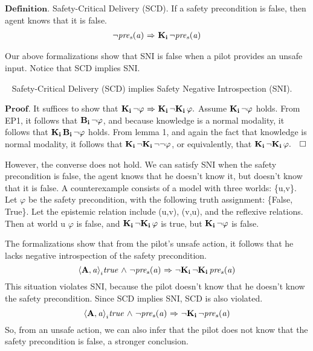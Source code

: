\noindent$\mathbf{Definition.}$ Safety-Critical Delivery (SCD). If a safety precondition is false, then agent knows that it is false. 
\begin{eqnarray*}
		{\neg} \mathit{pre_s}(\mathit{a}) {\ \Rightarrow \ } \mathbf{K}_{\mathbf{i}}\,{\neg} \mathit{pre_s}(\mathit{a})
\end{eqnarray*}


Our above formalizations show that SNI is false when a pilot provides an unsafe input. 
Notice that SCD implies SNI.
\begin{lemma}~\label{udsni}
	Safety-Critical Delivery (SCD) implies Safety Negative Introspection (SNI).
\end{lemma}	
$\mathbf{Proof}$. It suffices to show that $\mathbf{K}_{\mathbf{i}}\,{\neg}\varphi {\ \Rightarrow \ } \mathbf{K}_{\mathbf{i}}\,{\neg}\mathbf{K}_{\mathbf{i}}\, \varphi.$
Assume $\mathbf{K}_{\mathbf{i}}\,{\neg}\varphi$ holds. From EP1, it follows that $\mathbf{B}_{\mathbf{i}}\,{\neg}\varphi$, and because knowledge is a normal modality, it follows that $\mathbf{K}_{\mathbf{i}}\,\mathbf{B}_{\mathbf{i}}\,{\neg}\varphi$ holds. From lemma 1, and again the fact that knowledge is normal modality, it follows that $\mathbf{K}_{\mathbf{i}}\,{\neg}\mathbf{K}_{\mathbf{i}}\,{\neg}{\neg}\varphi$, or equivalently, that $\mathbf{K}_{\mathbf{i}}\,{\neg}\mathbf{K}_{\mathbf{i}}\,\varphi.\quad\Box$

However, the converse does not hold. We can satisfy SNI when the safety precondition is false, the agent knows that he doesn't know it, but doesn't know that it is false. A counterexample consists of a model with three worlds: \{u,v\}. Let $\varphi$ be the safety precondition, with the following truth assignment: \{False, True\}. Let the epistemic relation include (u,v), (v,u), and the reflexive relations. Then at world u $\varphi$ is false, and $\mathbf{K}_{\mathbf{i}}\,{\neg}\mathbf{K}_{\mathbf{i}}\,\varphi$ is true, but $\mathbf{K}_{\mathbf{i}}\,{\neg} \varphi$ is false. 

The formalizations show that from the pilot's unsafe action, it follows that he lacks negative introspection of the safety precondition. 
\begin{equation}
\mathbf{\langle A,\mathit{a}\rangle}_i\mathit{true} {\ \wedge \ } {\neg} \mathit{pre_s}(\mathit{a}) {\ \Rightarrow \ } {\neg} \mathbf{K}_{\mathbf{i}}\,{\neg} \mathbf{K}_{\mathbf{i}}\,\mathit{pre_s}(\mathit{a})
\end{equation}This situation violates SNI, because the pilot doesn't know that he doesn't know the safety precondition. Since SCD implies SNI, SCD is also violated.
\begin{equation}
\mathbf{\langle A,\mathit{a}\rangle}_i\mathit{true} {\ \wedge \ } {\neg} \mathit{pre_s}(\mathit{a}) {\ \Rightarrow \ } {\neg} \mathbf{K}_{\mathbf{i}}\,{\neg} \mathit{pre_s}(\mathit{a})
\end{equation} So, from an unsafe action, we can also infer that the pilot does not know that the safety precondition is false, a stronger conclusion.  

